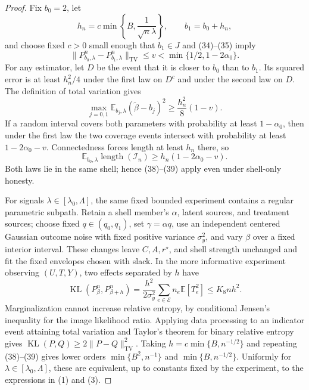 \documentclass{article}
\begin{document}
\begin{proof}
Fix \(b_0=2\), let
\[
 h_n=c\min\left\{B,\frac1{\sqrt n\lambda}\right\},
 \qquad b_1=b_0+h_n,                                                       \tag{36}
\]
and choose fixed \(c>0\) small enough that \(b_1\in J\) and (34)--(35) imply
\[
 \|P_{b_0,\lambda}^{n}-P_{b_1,\lambda}^{n}\|_{\mathrm{TV}}
 \leq v<\min\{1/2,1-2\alpha_0\}.                                       \tag{37}
\]
For any estimator, let \(D\) be the event that it is closer to \(b_0\) than to \(b_1\).  Its squared error is at least \(h_n^2/4\) under the first law on \(D^c\) and under the second law on \(D\).  The definition of total variation gives
\[
 \max_{j=0,1}\mathbb E_{b_j,\lambda}
 (\widetilde\beta-b_j)^2\geq\frac{h_n^2}{8}(1-v).                        \tag{38}
\]
If a random interval covers both parameters with probability at least \(1-\alpha_0\), then under the first law the two coverage events intersect with probability at least \(1-2\alpha_0-v\).  Connectedness forces length at least \(h_n\) there, so
\[
 \mathbb E_{b_0,\lambda}\operatorname{length}(\mathcal I_n)
 \geq h_n(1-2\alpha_0-v).                                                \tag{39}
\]
Both laws lie in the same shell; hence (38)--(39) apply even under shell-only honesty.

For signals \(\lambda\in[\lambda_0,\Lambda]\), the same fixed bounded experiment contains a regular parametric subpath.  Retain a shell member's \(\alpha\), latent sources, and treatment sources; choose fixed \(q\in(q_0,q_1)\), set \(\gamma=\alpha q\), use an independent centered Gaussian outcome noise with fixed positive variance \(\sigma_y^2\), and vary \(\beta\) over a fixed interior interval.  These changes leave \(C,A,r^\star\), and shell strength unchanged and fit the fixed envelopes chosen with slack.  In the more informative experiment observing \((U,T,Y)\), two effects separated by \(h\) have
\[
 \operatorname{KL}(P_\beta^n,P_{\beta+h}^n)
 =\frac{h^2}{2\sigma_y^2}
   \sum_{e\in\mathcal E}n_e\mathbb E[T_e^2]
 \leq K_8nh^2.                                                           \tag{40}
\]
Marginalization cannot increase relative entropy, by conditional Jensen's inequality for the image likelihood ratio.  Applying data processing to an indicator event attaining total variation and Taylor's theorem for binary relative entropy gives \(\operatorname{KL}(P,Q)\geq2\|P-Q\|_{\mathrm{TV}}^2\).  Taking \(h=c\min\{B,n^{-1/2}\}\) and repeating (38)--(39) gives lower orders \(\min\{B^2,n^{-1}\}\) and \(\min\{B,n^{-1/2}\}\).  Uniformly for \(\lambda\in[\lambda_0,\Lambda]\), these are equivalent, up to constants fixed by the experiment, to the expressions in (1) and (3).


\end{proof}
\end{document}
